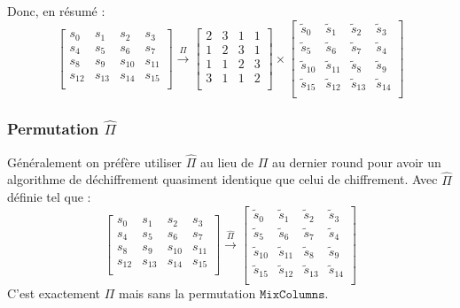 \documentclass[a4paper, 12pt]{article}
\begin{document}
\noindent Donc, en résumé : 
$$
\begin{bmatrix}
	s_{0} & s_{1} & s_{2} & s_{3} \\
	s_{4} & s_{5} & s_{6} & s_{7} \\
	s_{8} & s_{9} & s_{10} & s_{11} \\
	s_{12} & s_{13} & s_{14} & s_{15} \\
\end{bmatrix}
\overset{\Pi}{\rightarrow}
\begin{bmatrix}
	2 & 3 & 1 & 1 \\
	1 & 2 & 3 & 1 \\
	1 & 1 & 2 & 3 \\
	3 & 1 & 1 & 2 \\
\end{bmatrix}
\times
\begin{bmatrix}
	\tilde{s}_0 & \tilde{s}_1 & \tilde{s}_2 & \tilde{s}_3 \\
	\tilde{s}_5 & \tilde{s}_6 & \tilde{s}_7 & \tilde{s}_4 \\
	\tilde{s}_{10} & \tilde{s}_{11} & \tilde{s}_8 & \tilde{s}_9 \\
	\tilde{s}_{15} & \tilde{s}_{12} & \tilde{s}_{13} & \tilde{s}_{14} \\
\end{bmatrix}
$$

\subsubsection{Permutation $\hat{\Pi}$}
Généralement on préfère utiliser $\hat{\Pi}$ au lieu de $\Pi$  au dernier round pour avoir un algorithme de déchiffrement quasiment identique que celui de chiffrement. Avec $\hat{\Pi}$ définie tel que :
$$
\begin{bmatrix}
	s_{0} & s_{1} & s_{2} & s_{3} \\
	s_{4} & s_{5} & s_{6} & s_{7} \\
	s_{8} & s_{9} & s_{10} & s_{11} \\
	s_{12} & s_{13} & s_{14} & s_{15} \\
\end{bmatrix}
\overset{\hat{\Pi}}{\rightarrow}
\begin{bmatrix}
	\tilde{s}_0 & \tilde{s}_1 & \tilde{s}_2 & \tilde{s}_3 \\
	\tilde{s}_5 & \tilde{s}_6 & \tilde{s}_7 & \tilde{s}_4 \\
	\tilde{s}_{10} & \tilde{s}_{11} & \tilde{s}_8 & \tilde{s}_9 \\
	\tilde{s}_{15} & \tilde{s}_{12} & \tilde{s}_{13} & \tilde{s}_{14} \\
\end{bmatrix}
$$
C'est exactement $\Pi$ mais sans la permutation $\mathtt{MixColumns}$. 
\end{document}
